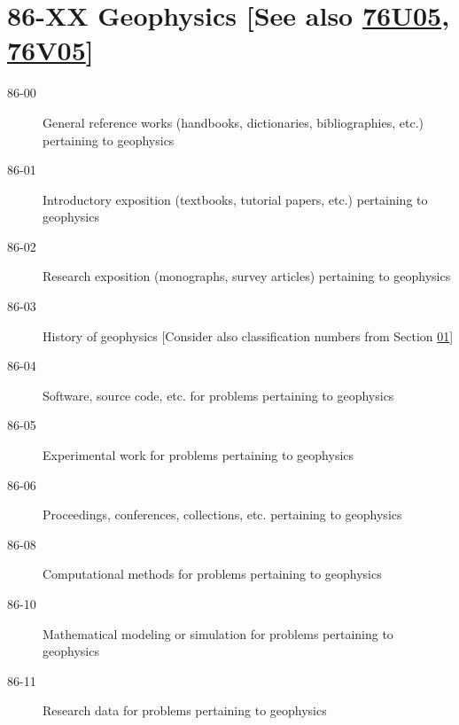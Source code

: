 \documentclass[letterpaper]{article}
\begin{document}
\section*{86-XX Geophysics [See also \hyperref[76U05]{76U05}, \hyperref[76V05]{76V05}] }\label{86-XX}
\begin{description}
\item [86-00]\label{86-00} General reference works (handbooks, dictionaries, bibliographies, etc.) pertaining to geophysics
\item [86-01]\label{86-01} Introductory exposition (textbooks, tutorial papers, etc.) pertaining to geophysics
\item [86-02]\label{86-02} Research exposition (monographs, survey articles) pertaining to geophysics
\item [86-03]\label{86-03} History of geophysics [Consider also classification numbers from Section \hyperref[01-XX]{01}]
\item [86-04]\label{86-04} Software, source code, etc. for problems pertaining to geophysics
\item [86-05]\label{86-05} Experimental work for problems pertaining to geophysics
\item [86-06]\label{86-06} Proceedings, conferences, collections, etc. pertaining to geophysics
\item [86-08]\label{86-08} Computational methods for problems pertaining to geophysics
\item [86-10]\label{86-10} Mathematical modeling or simulation for problems pertaining to geophysics
\item [86-11]\label{86-11} Research data for problems pertaining to geophysics
\end{description}
\end{document}
